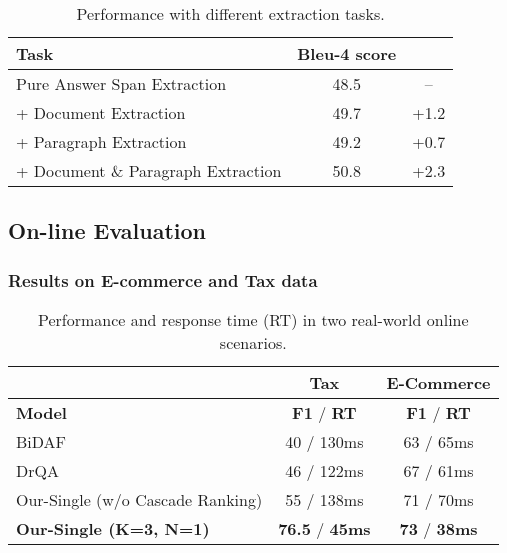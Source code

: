 \documentclass[letterpaper]{article} \usepackage{aaai19}  \usepackage{graphicx}
\begin{document}
\begin{table}[t]
    \scriptsize
    \centering
    \caption{\label{tab:5} Performance with different extraction tasks.}
\begin{tabular}{lcc}
    \hline
       \textbf{Task} & \textbf{Bleu-4 score}  & \textbf{} \\
    \hline
    	Pure Answer Span Extraction & 48.5 & -- \\
	+ Document Extraction & 49.7 & +1.2 \\
	+ Paragraph Extraction & 49.2 & +0.7 \\
	+ Document \& Paragraph Extraction & 50.8 & +2.3 \\
    \hline
    \end{tabular} \vspace{-3mm}
    \end{table}



\subsection{On-line Evaluation}




\subsubsection{Results on E-commerce and Tax data}

\begin{table}[t]
\scriptsize
\centering
\caption{\label{tab:6} Performance and response time (RT) in two real-world online scenarios.}
\begin{tabular}{lcc}
\hline
        & \textbf{Tax} & \textbf{E-Commerce} \\
\hline
    \textbf{Model} & \textbf{F1} / \textbf{RT} & \textbf{F1} / \textbf{RT} \\
\hline
    BiDAF \cite{joshi2017triviaqa} & 40 / 130ms &  63 / 65ms \\
    DrQA \cite{chen2017reading} & 46 / 122ms & 67 / 61ms \\
    Our-Single (w/o Cascade Ranking) & 55 / 138ms &  71 / 70ms \\
    \textbf{Our-Single (K=3, N=1)} & \textbf{76.5} / \textbf{45ms} &  \textbf{73} / \textbf{38ms} \\
\hline
\end{tabular} \vspace{-3mm}
\end{table} 
\end{document}
